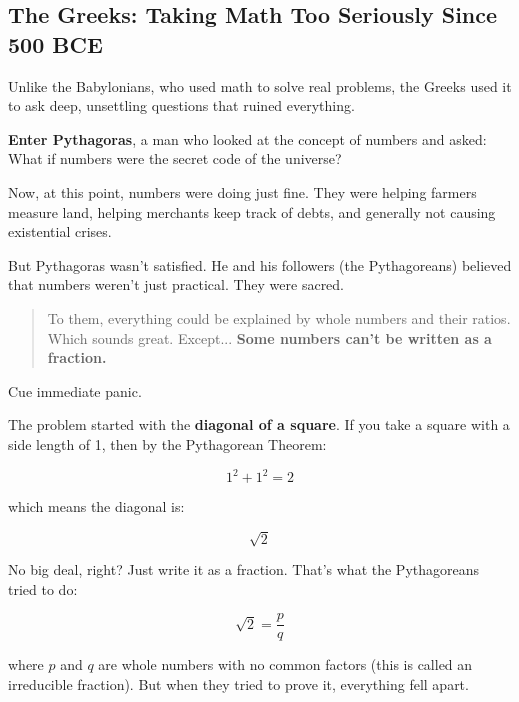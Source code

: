 \subsection{The Greeks: Taking Math Too Seriously Since 500 BCE}

Unlike the Babylonians, who used math to solve real problems, the Greeks used it to ask deep, unsettling questions that ruined everything.

\textbf{Enter Pythagoras}, a man who looked at the concept of numbers and asked: What if numbers were the secret code of the universe?

Now, at this point, numbers were doing just fine. They were helping farmers measure land, helping merchants keep track of debts, and generally not causing existential crises.  

But Pythagoras wasn’t satisfied. He and his followers (the Pythagoreans) believed that numbers weren’t just practical. They were sacred.  

\begin{quote}
To them, everything could be explained by whole numbers and their ratios.  Which sounds great. Except...  \textbf{Some numbers can’t be written as a fraction.}
\end{quote}

Cue immediate panic.  

The problem started with the \textbf{diagonal of a square}. If you take a square with a side length of 1, then by the Pythagorean Theorem:

\[
1^2 + 1^2 = 2
\]

which means the diagonal is:

\[
\sqrt{2}
\]

No big deal, right? Just write it as a fraction. That’s what the Pythagoreans tried to do:

\[
\sqrt{2} = \frac{p}{q}
\]

where \( p \) and \( q \) are whole numbers with no common factors (this is called an irreducible fraction). But when they tried to prove it, everything fell apart.


